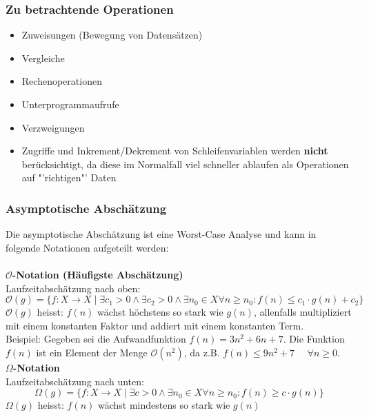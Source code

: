 \subsubsection{Zu betrachtende Operationen}
\begin{multicols}{2}
    \begin{itemize}
        \item Zuweisungen (Bewegung von Datensätzen)
        \item Vergleiche
        \item Rechenoperationen
        \item Unterprogrammaufrufe
        \item Verzweigungen
    \end{itemize}
		\vfill\null
		\columnbreak
		\begin{itemize}
			\item Zugriffe und Inkrement/Dekrement von Schleifenvariablen werden \textbf{nicht} berücksichtigt, da diese im Normalfall viel schneller ablaufen als Operationen auf "'richtigen"' Daten
		\end{itemize}
\end{multicols}

\subsubsection{Asymptotische Abschätzung}
Die asymptotische Abschätzung ist eine Worst-Case Analyse und kann in folgende Notationen aufgeteilt werden:\\
\\
\textbf{$\mathcal{O}$-Notation (Häufigste Abschätzung)}\\
Laufzeitabschätzung nach oben:
\begin{equation}
	\mathcal{O}(g) = \{f: X \rightarrow X \mid \exists {c_1}>0 \wedge \exists c_2>0 \wedge \exists n_0 \in X  \forall n \geq n_0 : f(n) \leq c_1\cdot g(n) + c_2\}
\end{equation}
$\mathcal{O}(g)$ heisst: $f(n)$ wächst höchstens so stark wie $g(n)$, allenfalls multipliziert mit einem konstanten Faktor und addiert mit einem konstanten Term.\\
Beispiel: Gegeben sei die Aufwandfunktion $f(n)=3n^2 + 6n + 7$. Die Funktion $f(n)$ ist ein Element der Menge $\mathcal{O}(n^2)$, da z.B. $f(n) \leq 9n^2 + 7$ \ \ $\forall n \geq 0$.\\

\textbf{$\Omega$-Notation}\\
Laufzeitabschätzung nach unten:
\begin{equation}
\Omega(g) = \{f: X \rightarrow X \mid \exists c>0 \wedge \exists n_0 \in X  \forall n \geq n_0 : f(n) \geq c\cdot g(n)\}
\end{equation}
$\Omega(g)$ heisst: $f(n)$ wächst mindestens so stark wie $g(n)$\\

